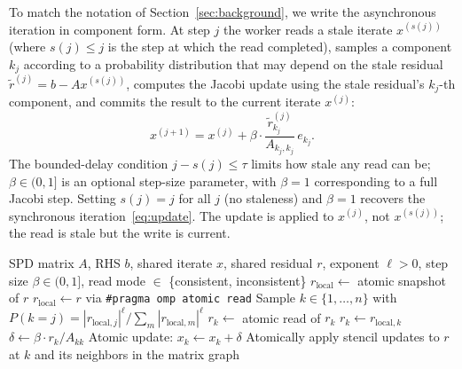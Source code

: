 \documentclass[pdflatex,sn-mathphys-num]{sn-jnl}%
\theoremstyle{thmstyleone}%
\theoremstyle{thmstyletwo}%
\theoremstyle{thmstylethree}%
\begin{document}
To match the notation of Section~\ref{sec:background}, we write the asynchronous iteration in component form. At step $j$ the worker reads a stale iterate $x^{(s(j))}$ (where $s(j) \leq j$ is the step at which the read completed), samples a component $k_j$ according to a probability distribution that may depend on the stale residual $\tilde r^{(j)} = b - A x^{(s(j))}$, computes the Jacobi update using the stale residual's $k_j$-th component, and commits the result to the current iterate $x^{(j)}$:
\begin{equation}
\label{eq:async-update}
x^{(j+1)} = x^{(j)} + \beta\cdot\frac{\tilde r_{k_j}^{(j)}}{A_{k_j, k_j}}\, e_{k_j}.
\end{equation}
The bounded-delay condition $j - s(j) \leq \tau$ limits how stale any read can be; $\beta \in (0, 1]$ is an optional step-size parameter, with $\beta = 1$ corresponding to a full Jacobi step. Setting $s(j) = j$ for all $j$ (no staleness) and $\beta = 1$ recovers the synchronous iteration~\eqref{eq:update}. The update is applied to $x^{(j)}$, not $x^{(s(j))}$; the read is stale but the write is current.

\begin{algorithm}[ht]
\small
\caption{Asynchronous power-weighted randomized Jacobi (per-worker loop)}
\label{alg:async-power-jacobi}
\begin{algorithmic}[1]
\Require SPD matrix $A$, RHS $b$, shared iterate $x$, shared
         residual $r$, exponent $\ell > 0$, step size
         $\beta \in (0, 1]$, read mode $\in$ \{consistent,
         inconsistent\}
    \State $r_{\text{local}} \gets$ atomic snapshot of $r$
  \Else
    \State $r_{\text{local}} \gets r$ via \texttt{\#pragma omp atomic read}
  \EndIf
  \State Sample $k \in \{1, \ldots, n\}$ with
         $P(k = j) = |r_{\text{local},j}|^\ell / \sum_m |r_{\text{local},m}|^\ell$
    \State $r_k \gets$ atomic read of $r_k$
  \Else
    \State $r_k \gets r_{\text{local},k}$
  \EndIf
  \State $\delta \gets \beta \cdot r_k / A_{kk}$
  \State Atomic update: $x_k \gets x_k + \delta$
  \State Atomically apply stencil updates to $r$ at $k$ and
         its neighbors in the matrix graph
\EndWhile
\end{algorithmic}
\end{algorithm}
\end{document}
